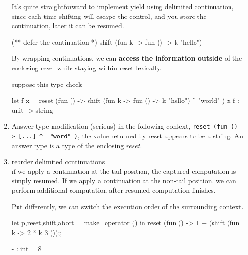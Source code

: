 \begin{enumerate}
It's quite straightforward to implement yield using delimited
continuation, since each time shifting will escape the control, and you store the continuation, later it can be resumed.


\begin{bluetext}
(** defer the continuation *)  
shift (fun k -> fun () -> k "hello")
\end{bluetext}

By wrapping continuations, we can \textbf{access the information outside} of the enclosing
reset while staying within reset lexically.

suppose this type check

\begin{alternate}
  let f x = reset (fun () -> shift (fun k -> fun () -> k "hello") ^ "world" ) x
  f : unit -> string 
\end{alternate}

\item Answer type modification (serious)
  in the following context,
  \verb|reset (fun () -> [...] ^  "word" )|, the value returned by
  reset appears to be a string. An answer type is a type of the enclosing
  \emph{reset}.

\item reorder delimited continuations \\
  if we apply a continuation at the tail position, the captured computation is simply
  resumed. If we apply a continuation at the non-tail position, we can perform
  additional computation after resumed computation finishes.

  Put differently, we can switch the execution order of the surrounding context.

\begin{ocamlcode}
let p,reset,shift,abort = make_operator () in
    reset (fun () -> 1 + (shift (fun k -> 2 * k 3 )));;
\end{ocamlcode}
\begin{ocamlcode}
- : int = 8    
\end{ocamlcode}


\end{enumerate}
